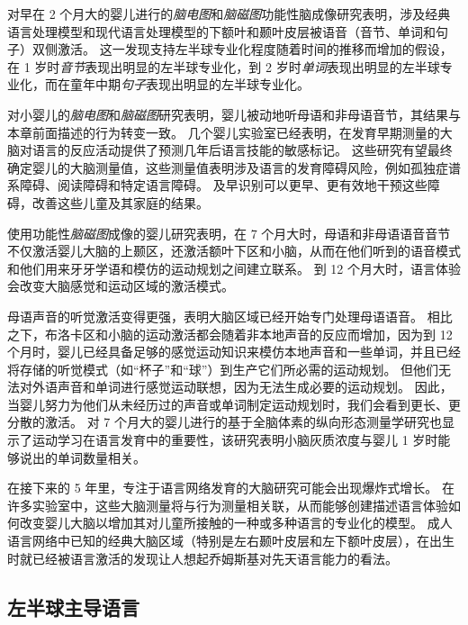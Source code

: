 对早在 2 个月大的婴儿进行的\textit{脑电图}和\textit{脑磁图}功能性脑成像研究表明，涉及经典语言处理模型和现代语言处理模型的下额叶和颞叶皮层被语音（音节、单词和句子）双侧激活。
这一发现支持左半球专业化程度随着时间的推移而增加的假设，在 1 岁时\textit{音节}表现出明显的左半球专业化，到 2 岁时\textit{单词}表现出明显的左半球专业化，而在童年中期\textit{句子}表现出明显的左半球专业化。


对小婴儿的\textit{脑电图}和\textit{脑磁图}研究表明，婴儿被动地听母语和非母语音节，其结果与本章前面描述的行为转变一致。
几个婴儿实验室已经表明，在发育早期测量的大脑对语言的反应活动提供了预测几年后语言技能的敏感标记。
这些研究有望最终确定婴儿的大脑测量值，这些测量值表明涉及语言的发育障碍风险，例如孤独症谱系障碍、阅读障碍和特定语言障碍。
及早识别可以更早、更有效地干预这些障碍，改善这些儿童及其家庭的结果。


使用功能性\textit{脑磁图}成像的婴儿研究表明，在 7 个月大时，母语和非母语语音音节不仅激活婴儿大脑的上颞区，还激活额叶下区和小脑，从而在他们听到的语音模式和他们用来牙牙学语和模仿的运动规划之间建立联系。
到 12 个月大时，语言体验会改变大脑感觉和运动区域的激活模式。


母语声音的听觉激活变得更强，表明大脑区域已经开始专门处理母语语音。
相比之下，布洛卡区和小脑的运动激活都会随着非本地声音的反应而增加，因为到 12 个月时，婴儿已经具备足够的感觉运动知识来模仿本地声音和一些单词，并且已经将存储的听觉模式（如“杯子”和“球”）到生产它们所必需的运动规划。
但他们无法对外语声音和单词进行感觉运动联想，因为无法生成必要的运动规划。
因此，当婴儿努力为他们从未经历过的声音或单词制定运动规划时，我们会看到更长、更分散的激活。
对 7 个月大的婴儿进行的基于全脑体素的纵向形态测量学研究也显示了运动学习在语言发育中的重要性，该研究表明小脑灰质浓度与婴儿 1 岁时能够说出的单词数量相关。


在接下来的 5 年里，专注于语言网络发育的大脑研究可能会出现爆炸式增长。
在许多实验室中，这些大脑测量将与行为测量相关联，从而能够创建描述语言体验如何改变婴儿大脑以增加其对儿童所接触的一种或多种语言的专业化的模型。
成人语言网络中已知的经典大脑区域（特别是左右颞叶皮层和左下额叶皮层），在出生时就已经被语言激活的发现让人想起乔姆斯基对先天语言能力的看法。



\subsection{左半球主导语言}

